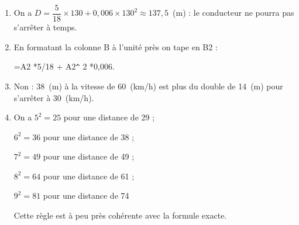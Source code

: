 \documentclass[10pt]{article}
\begin{document}
\begin{enumerate}
\item %
On a $D = \dfrac{5}{18} \times  130 + 0,006 \times  130^2 \approx 137,5$~(m) : le conducteur ne pourra pas s’arrêter à temps.
\item %


En formatant la colonne B à l’unité près on tape en B2 : 

=A2 *5/18 + A2\verb|^| 2  *0,006.
\item %
Non : 38~(m) à la vitesse de 60~(km/h) est plus du double de 14~(m) pour s’arrêter à 30~(km/h).
\item %
 
On a $5^2 = 25$ pour une distance de 29 ;

$6^2 = 36$ pour une distance de 38 ;

$7^2 = 49$ pour une distance de 49 ;

$8^2 = 64$ pour une distance de 61 ; 

$9^2 = 81$ pour une distance de 74

Cette règle est à peu près cohérente avec la formule exacte.
\end{enumerate}
\end{document}
